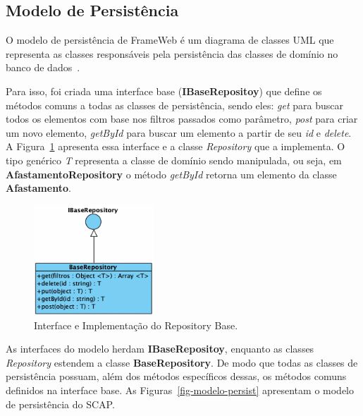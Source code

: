 \subsection{Modelo de Persistência}
\label{subsec-frameweb-persistencia}

O modelo de persistência de FrameWeb é um diagrama de classes UML que representa
as classes responsáveis pela persistência das classes de domínio no banco de dados~\cite{souza:2007}.

Para isso, foi criada uma interface base (\textbf{IBaseRepositoy}) que define os métodos comuns a todas as classes de persistência,
sendo eles: \textit{get} para buscar todos os elementos com base nos filtros passados como parâmetro,
\textit{post} para criar um novo elemento, \textit{getById} para buscar um elemento a partir de seu
\textit{id} e \textit{delete}. A Figura~\ref{fig-modelo-persist-base} apresenta essa interface e a
classe \textit{Repository} que a implementa. O tipo genérico \textit{T} representa a classe de domínio
sendo manipulada, ou seja, em \textbf{AfastamentoRepository} o método \textit{getById}
retorna um elemento da classe \textbf{Afastamento}.


\begin{figure}[h!]
    \centering
    \includegraphics[width=0.4\textwidth]{figuras/fig-modelo-persist-base.png}
    \caption{Interface e Implementação do Repository Base.}
    \label{fig-modelo-persist-base}
\end{figure}


As interfaces do modelo herdam \textbf{IBaseRepositoy}, enquanto as classes \textit{Repository} estendem a
classe \textbf{BaseRepository}. De modo que todas as classes de persistência possuam, além dos métodos
específicos dessas, os métodos comuns definidos na interface base. As Figuras~\ref{fig-modelo-persist}
apresentam o modelo de persistência do SCAP.

